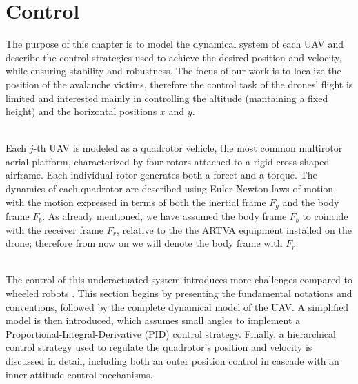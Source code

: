 \chapter{Control}
The purpose of this chapter is to model the dynamical system 
of each UAV and describe the control strategies used to achieve the 
desired position and velocity, while ensuring stability and robustness.
The focus of our work is to localize the position of the 
avalanche victims, therefore the control task of the drones' flight 
is limited and interested mainly in controlling the altitude 
(mantaining a fixed height) and the horizontal positions
$x$ and $y$.

\noindent\\
Each $j$-th UAV is modeled as a quadrotor vehicle, the most common 
multirotor aerial platform, characterized by four rotors attached 
to a rigid cross-shaped airframe. Each individual rotor generates 
both a forcet and a torque. The dynamics of each quadrotor are 
described using Euler-Newton laws of motion, with the motion 
expressed in terms of both the inertial frame \( F_g \) and the 
body frame \( F_b \).
As already mentioned, we have assumed the body frame $F_b$
to coincide with the receiver frame $F_r$, relative to the
the ARTVA equipment installed on the drone; therefore 
from now on we will denote the body frame with $F_r$.

\noindent\\
The control of this underactuated system introduces more challenges 
compared to wheeled robots \cite{model_quadrotor}. This section begins 
by presenting the fundamental notations and conventions, 
followed by the complete dynamical model of the UAV. A simplified model is 
then introduced, which assumes small angles to implement a 
Proportional-Integral-Derivative (PID) control strategy. 
Finally, a hierarchical control strategy used to regulate the 
quadrotor's position and velocity is discussed in detail, 
including both an outer position control in cascade with an inner 
attitude control mechanisms.

